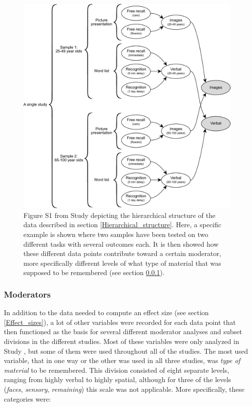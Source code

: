 \begin{figure} \centering \includegraphics[width=120mm]{./Figures/Study1_Explanation.pdf} \caption{Figure S1 from Study  depicting the hierarchical structure of the data described in section \ref{Hierarchical_structure}. Here, a specific example is shown where two samples have been tested on two different tasks with several outcomes each. It is then showed how these different data points contribute toward a certain moderator, more specifically different levels of what type of material that was supposed to be remembered (see section \ref{Moderators}).} \label{Figure:Study1_Explanation} \end{figure}

\subsubsection{Moderators} \label{Moderators} In addition to the data needed to compute an effect size (see section \ref{Effect_sizes}), a lot of other variables were recorded for each data point that then functioned as the basis for several different moderator analyses and subset divisions in the different studies. Most of these variables were only analyzed in Study , but some of them were used throughout all of the studies. The most used variable, that in one way or the other was used in all three studies, was \emph{type of material} to be remembered. This division consisted of eight separate levels, ranging from highly verbal to highly spatial, although for three of the levels (\emph{faces}, \emph{sensory}, \emph{remaining}) this scale was not applicable. More specifically, these categories were:

